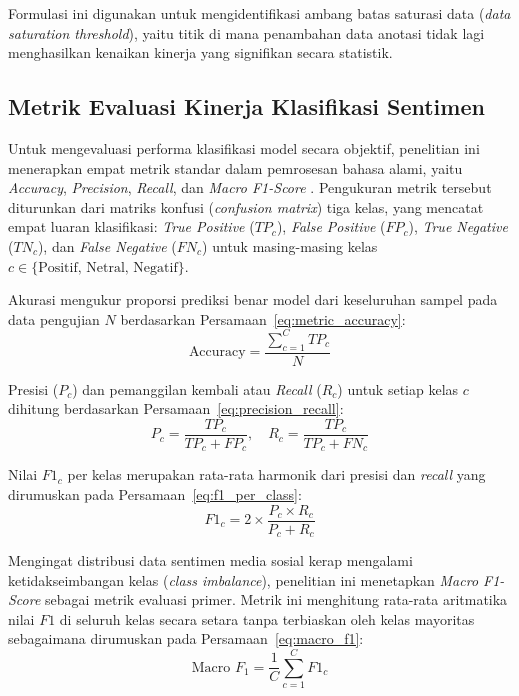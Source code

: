 Formulasi ini digunakan untuk mengidentifikasi ambang batas saturasi data (\textit{data saturation threshold}), yaitu titik di mana penambahan data anotasi tidak lagi menghasilkan kenaikan kinerja yang signifikan secara statistik.

\subsection{Metrik Evaluasi Kinerja Klasifikasi Sentimen}

Untuk mengevaluasi performa klasifikasi model secara objektif, penelitian ini menerapkan empat metrik standar dalam pemrosesan bahasa alami, yaitu \textit{Accuracy}, \textit{Precision}, \textit{Recall}, dan \textit{Macro F1-Score} \citep{winata2023nusax}. Pengukuran metrik tersebut diturunkan dari matriks konfusi (\textit{confusion matrix}) tiga kelas, yang mencatat empat luaran klasifikasi: \textit{True Positive} ($TP_c$), \textit{False Positive} ($FP_c$), \textit{True Negative} ($TN_c$), dan \textit{False Negative} ($FN_c$) untuk masing-masing kelas $c \in \{\text{Positif, Netral, Negatif}\}$.

Akurasi mengukur proporsi prediksi benar model dari keseluruhan sampel pada data pengujian $N$ berdasarkan Persamaan~\eqref{eq:metric_accuracy}:
\begin{equation}
\label{eq:metric_accuracy}
\text{Accuracy} = \frac{\sum_{c=1}^{C} TP_c}{N}
\end{equation}

Presisi ($P_c$) dan pemanggilan kembali atau \textit{Recall} ($R_c$) untuk setiap kelas $c$ dihitung berdasarkan Persamaan~\eqref{eq:precision_recall}:
\begin{equation}
\label{eq:precision_recall}
P_c = \frac{TP_c}{TP_c + FP_c}, \quad R_c = \frac{TP_c}{TP_c + FN_c}
\end{equation}

Nilai $F1_c$ per kelas merupakan rata-rata harmonik dari presisi dan \textit{recall} yang dirumuskan pada Persamaan~\eqref{eq:f1_per_class}:
\begin{equation}
\label{eq:f1_per_class}
F1_c = 2 \times \frac{P_c \times R_c}{P_c + R_c}
\end{equation}

Mengingat distribusi data sentimen media sosial kerap mengalami ketidakseimbangan kelas (\textit{class imbalance}), penelitian ini menetapkan \textit{Macro F1-Score} sebagai metrik evaluasi primer. Metrik ini menghitung rata-rata aritmatika nilai $F1$ di seluruh kelas secara setara tanpa terbiaskan oleh kelas mayoritas sebagaimana dirumuskan pada Persamaan~\eqref{eq:macro_f1}:
\begin{equation}
\label{eq:macro_f1}
\text{Macro } F_1 = \frac{1}{C} \sum_{c=1}^{C} F1_c
\end{equation}

